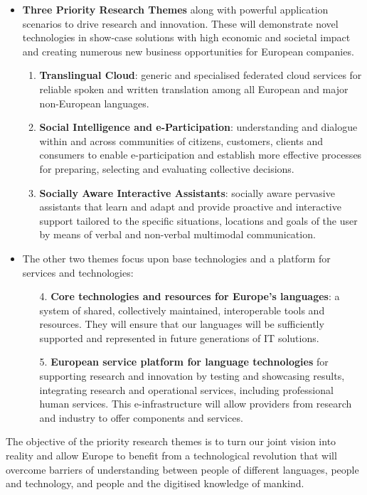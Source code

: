 \documentclass[10pt, plain]{../../metanetpaper}
\begin{document}
\begin{multicols}{2}
\begin{itemize}
\item \textbf{Three Priority Research Themes} along with powerful application scenarios to drive research and innovation. These will demonstrate novel technologies in show-case solutions with high economic and societal impact and creating numerous new business opportunities for European companies.
  \begin{enumerate}
  \item \textbf{Translingual Cloud}: generic and specialised federated cloud services for reliable spoken and written translation among all European and major non-European languages.
  \item \textbf{Social Intelligence and e-Participation}: understanding and dialogue within and across communities of citizens, customers, clients and consumers to enable e-participation and establish more effective processes for preparing, selecting and evaluating collective decisions.
  \item \textbf{Socially Aware Interactive Assistants}: socially aware pervasive assistants that learn and adapt and provide proactive and interactive support tailored to the specific situations, locations and goals of the user by means of verbal and non-verbal multimodal communication.
  \end{enumerate}
\item The other two themes focus upon base technologies and a platform for services and technologies:
  \begin{enumerate}
  \item[4.] \textbf{Core technologies and resources for Europe's languages}: a system of shared, collectively maintained, interoperable tools and resources. They will ensure that our languages will be sufficiently supported and represented in future generations of IT solutions.
  \item[5.] \textbf{European service platform for language technologies} for supporting research and innovation by testing and showcasing results, integrating research and operational services, including professional human services. This e-infrastructure will allow providers from research and industry to offer components and services. 
  \end{enumerate}
\end{itemize}

The objective of the priority research themes is to turn our joint vision into reality and allow Europe to benefit from a technological revolution that will overcome barriers of understanding between people of different languages, people and technology, and people and the digitised knowledge of mankind.


\end{multicols}
\end{document}
